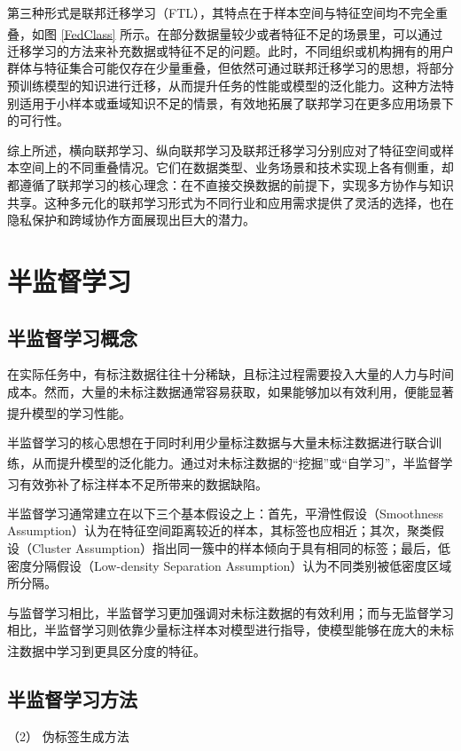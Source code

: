 第三种形式是联邦迁移学习（FTL），其特点在于样本空间与特征空间均不完全重叠\textsuperscript{\cite{yang2019federated,chen2020vafl}}，如图 \ref{FedClass} 所示。在部分数据量较少或者特征不足的场景里，可以通过迁移学习的方法来补充数据或特征不足的问题。此时，不同组织或机构拥有的用户群体与特征集合可能仅存在少量重叠，但依然可通过联邦迁移学习的思想，将部分预训练模型的知识进行迁移，从而提升任务的性能或模型的泛化能力。这种方法特别适用于小样本或垂域知识不足的情景，有效地拓展了联邦学习在更多应用场景下的可行性。

综上所述，横向联邦学习、纵向联邦学习及联邦迁移学习分别应对了特征空间或样本空间上的不同重叠情况。它们在数据类型、业务场景和技术实现上各有侧重，却都遵循了联邦学习的核心理念：在不直接交换数据的前提下，实现多方协作与知识共享。这种多元化的联邦学习形式为不同行业和应用需求提供了灵活的选择，也在隐私保护和跨域协作方面展现出巨大的潜力。
\section{半监督学习}
\subsection{半监督学习概念}
在实际任务中，有标注数据往往十分稀缺，且标注过程需要投入大量的人力与时间成本。然而，大量的未标注数据通常容易获取，如果能够加以有效利用，便能显著提升模型的学习性能\textsuperscript{\cite{2015Semi}}。

半监督学习的核心思想在于同时利用少量标注数据与大量未标注数据进行联合训练，从而提升模型的泛化能力\textsuperscript{\cite{van2020survey}}。通过对未标注数据的“挖掘”或“自学习”，半监督学习有效弥补了标注样本不足所带来的数据缺陷\textsuperscript{\cite{van2020survey}}。

半监督学习通常建立在以下三个基本假设之上：首先，平滑性假设（Smoothness Assumption）认为在特征空间距离较近的样本，其标签也应相近；其次，聚类假设（Cluster Assumption）指出同一簇中的样本倾向于具有相同的标签；最后，低密度分隔假设（Low-density Separation Assumption）认为不同类别被低密度区域所分隔。

与监督学习相比，半监督学习更加强调对未标注数据的有效利用；而与无监督学习相比，半监督学习则依靠少量标注样本对模型进行指导，使模型能够在庞大的未标注数据中学习到更具区分度的特征\textsuperscript{\cite{van2020survey}}。
\subsection{半监督学习方法}

（2） 伪标签生成方法

